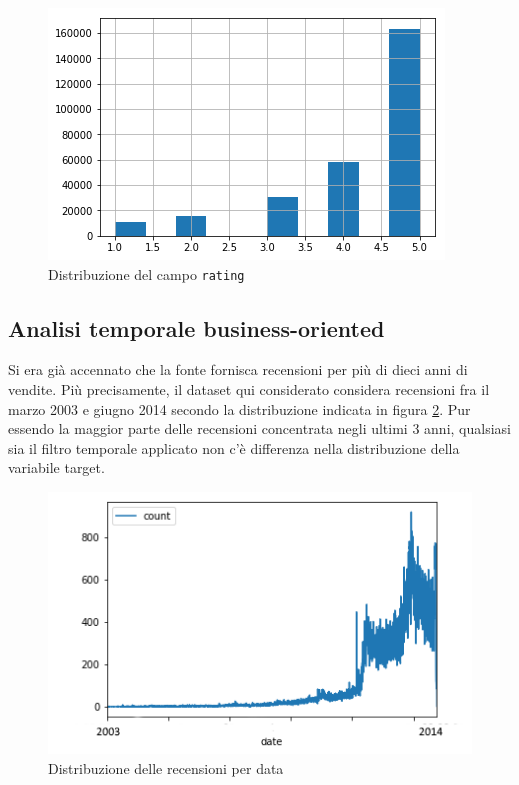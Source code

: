 \documentclass[hidelinks, 12pt]{article}
\begin{document}
\begin{figure}[H]
	\centering
	\includegraphics[scale=0.7]{images/02_01_rating_distr.png}
	\caption[Distribuzione del campo \texttt{rating}]{Distribuzione del campo \texttt{rating}}
	\label{fig:rating-distr-orig}
\end{figure}



\subsection{Analisi temporale business-oriented}

Si era già accennato che la fonte fornisca recensioni per più di dieci anni di vendite. Più precisamente, il dataset qui considerato considera recensioni fra il marzo 2003 e giugno 2014 secondo la distribuzione indicata in figura \ref{fig:date-distr}. Pur essendo la maggior parte delle recensioni concentrata negli ultimi 3 anni, qualsiasi sia il filtro temporale applicato non c'è differenza nella distribuzione della variabile target.

\begin{figure}[H]
	\centering
	\includegraphics[scale=0.7]{images/02_02_date_distr.png}
	\caption[Distribuzione delle recensioni per data]{Distribuzione delle recensioni per data}
	\label{fig:date-distr}
\end{figure}
\end{document}
